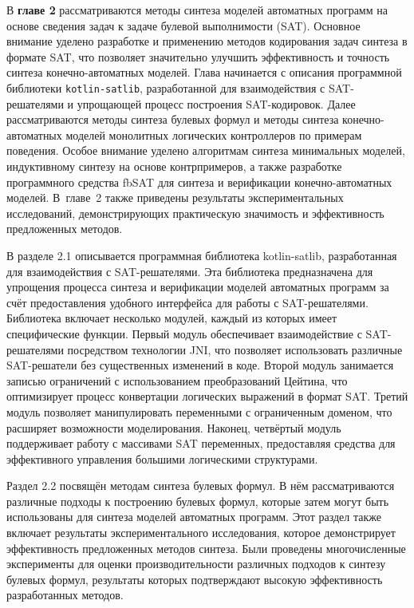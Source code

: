 В \textbf{главе 2} рассматриваются методы синтеза моделей автоматных программ на основе сведения задач к задаче булевой выполнимости (SAT).
Основное внимание уделено разработке и применению методов кодирования задач синтеза в формате SAT, что позволяет значительно улучшить эффективность и точность синтеза конечно-автоматных моделей.
Глава начинается с описания программной библиотеки \texttt{kotlin-satlib}, разработанной для взаимодействия с SAT-решателями и упрощающей процесс построения SAT-кодировок.
Далее рассматриваются методы синтеза булевых формул и методы синтеза конечно-автоматных моделей монолитных логических контроллеров по примерам поведения.
Особое внимание уделено алгоритмам синтеза минимальных моделей, индуктивному синтезу на основе контрпримеров, а также разработке программного средства fbSAT для синтеза и верификации конечно-автоматных моделей.
В~главе~2 также приведены результаты экспериментальных исследований, демонстрирующих практическую значимость и эффективность предложенных методов.

В разделе 2.1 описывается программная библиотека kotlin-satlib, разработанная для взаимодействия с SAT-решателями. Эта библиотека предназначена для упрощения процесса синтеза и верификации моделей автоматных программ за счёт предоставления удобного интерфейса для работы с SAT-решателями. Библиотека включает несколько модулей, каждый из которых имеет специфические функции. Первый модуль обеспечивает взаимодействие с SAT-решателями посредством технологии JNI, что позволяет использовать различные SAT-решатели без существенных изменений в коде. Второй модуль занимается записью ограничений с использованием преобразований Цейтина, что оптимизирует процесс конвертации логических выражений в формат SAT. Третий модуль позволяет манипулировать переменными с ограниченным доменом, что расширяет возможности моделирования. Наконец, четвёртый модуль поддерживает работу с массивами SAT переменных, предоставляя средства для эффективного управления большими логическими структурами.

Раздел 2.2 посвящён методам синтеза булевых формул. В нём рассматриваются различные подходы к построению булевых формул, которые затем могут быть использованы для синтеза моделей автоматных программ. Этот раздел также включает результаты экспериментального исследования, которое демонстрирует эффективность предложенных методов синтеза. Были проведены многочисленные эксперименты для оценки производительности различных подходов к синтезу булевых формул, результаты которых подтверждают высокую эффективность разработанных методов.

